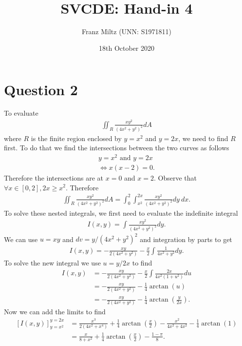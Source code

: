 \documentclass{article}
\begin{document}
\title{SVCDE: Hand-in 4}
\author{Franz Miltz (UNN: S1971811)}
\date{18th October 2020}
\maketitle
\section*{Question 2}
To evaluate
\begin{align*}
  \iint_R\frac{xy^2}{(4x^2+y^2)^2}dA
\end{align*}
where $R$ is the finite region enclosed by $y=x^2$ and $y=2x$,
we need to find $R$ first. To do that we find the intersections between the
two curves as follows
\begin{align*}
  y=x^2 \text{ and } y = 2x\\
  \Leftrightarrow x(x-2)=0.
\end{align*}
Therefore the intersections are at $x=0$ and $x=2$. Observe that
$\forall x\in[0,2], 2x\geq x^2$. Therefore
\begin{align*}
  \iint_R \frac{xy^2}{(4x^2+y^2)^2} dA
  = \int_0^2\int_{x^2}^{2x} \frac{xy^2}{(4x^2+y^2)^2}dy\: dx.
\end{align*}
To solve these nested integrals, we first need to evaluate the
indefinite integral
\begin{align*}
  I(x,y) = \int \frac{xy^2}{(4x^2+y^2)^2}dy.
\end{align*}
We can use $u=xy$ and $dv=y/(4x^2+y^2)^2$ and integration by
parts to get
\begin{align*}
  I(x,y) = -\frac{xy}{2(4x^2+y^2)}-\frac{x}{2}\int \frac{1}{4x^2+y^2}dy.
\end{align*}
To solve the new integral we use $u=y/2x$ to find
\begin{align*}
  I(x,y) &= -\frac{xy}{2(4x^2+y^2)}-\frac{x}{2}\int \frac{2x}{4x^2(1+u^2)}du\\
  &= -\frac{xy}{2(4x^2+y^2)}-\frac{1}{4}\arctan(u)\\
  &= -\frac{xy}{2(4x^2+y^2)}-\frac{1}{4}\arctan\left(\frac{y}{2x}\right).
\end{align*}
Now we can add the limits to find
\begin{align*}
  \left[I(x,y)\right]^{y=2x}_{y=x^2}&=\frac{x^3}{2(4x^2+x^4)}
  +\frac{1}{4}\arctan\left(\frac{x}{2}\right)-\frac{x^2}{4x^2+4x^2}
  -\frac{1}{4}\arctan(1)\\
  &=\frac{x}{8+x^2}+\frac{1}{4}\arctan\left(\frac{x}{2}\right)
  -\frac{1-\pi}{8}.
\end{align*}
\end{document}
